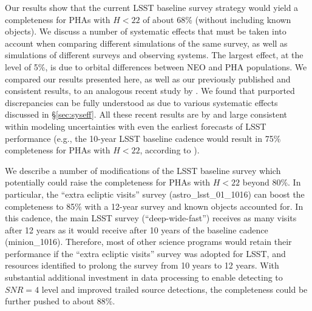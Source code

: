 Our results show that the current LSST baseline survey strategy would yield a completeness for PHAs
with $H<22$ of about 68\% (without including known objects). We discuss a number of systematic effects that must be taken into
account when comparing different simulations of the same survey, as well as simulations of different
surveys and observing systems. The largest effect, at the level of 5\%, is due to orbital differences
between NEO and PHA populations. We compared our results presented here, as well as our previously
published and consistent results, to an analogous recent study by \citet[]{GMS2016}. We found that
purported discrepancies can be fully understood as due to various systematic effects discussed in
\S\ref{sec:syseff}. All these recent results are by and large consistent within modeling uncertainties 
with even the earliest forecasts of LSST
performance (e.g., the 10-year LSST baseline cadence would result in 75\% completeness for PHAs
with $H<22$, according to \citealt{IvezicNEO2007}).

We describe a number of modifications of the LSST baseline survey which potentially could raise the
completeness for PHAs with $H<22$ beyond 80\%. In particular, the ``extra ecliptic visits'' survey
(astro\_lsst\_01\_1016) can boost the completeness to 85\% with a 12-year survey and known objects
accounted for. In this cadence, the main LSST survey (``deep-wide-fast'')
receives as many visits after 12 years as it would receive after 10 years of the
baseline cadence (minion\_1016). Therefore, most of other science programs would
retain their performance if the ``extra ecliptic visits'' survey was adopted for
LSST, and resources identified to prolong the survey from 10 years to 12 years. With substantial additional 
investment in data processing to enable detecting to $SNR=4$ level and improved trailed source detections, 
the completeness could be further pushed to about 88\%. 
